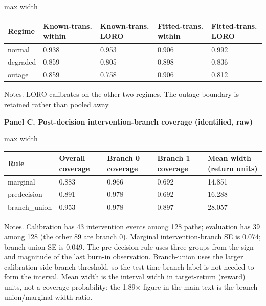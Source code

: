 \begin{table}[!ht]
\begin{adjustbox}{max width=\linewidth}
\begin{tabular}{@{}lllll@{}}
\toprule
Regime & Known-trans. within & Known-trans. LORO & Fitted-trans. within & Fitted-trans. LORO \\
\midrule
normal & 0.938 & 0.953 & 0.906 & 0.992 \\
degraded & 0.859 & 0.805 & 0.898 & 0.836 \\
outage & 0.859 & 0.758 & 0.906 & 0.812 \\
\bottomrule
\end{tabular}
\end{adjustbox}
\vspace{0.5em}
\par\noindent\begin{minipage}{\linewidth}\raggedright{\scriptsize Notes. LORO calibrates on the other two regimes. The outage boundary is retained rather than pooled away.}\end{minipage}\par

\par\textbf{Panel C. Post-decision intervention-branch coverage (identified, raw)}

\begin{adjustbox}{max width=\linewidth}
\begin{tabular}{@{}lllll@{}}
\toprule
Rule & Overall coverage & Branch 0 coverage & Branch 1 coverage & Mean width (return units) \\
\midrule
marginal & 0.883 & 0.966 & 0.692 & 14.851 \\
predecision & 0.891 & 0.978 & 0.692 & 16.288 \\
branch\_union & 0.953 & 0.978 & 0.897 & 28.057 \\
\bottomrule
\end{tabular}
\end{adjustbox}
\vspace{0.5em}
\par\noindent\begin{minipage}{\linewidth}\raggedright{\scriptsize Notes. Calibration has 43 intervention events among 128 paths; evaluation has 39 among 128 (the other 89 are branch 0). Marginal intervention-branch SE is 0.074; branch-union SE is 0.049. The pre-decision rule uses three groups from the sign and magnitude of the last burn-in observation. Branch-union uses the larger calibration-side branch threshold, so the test-time branch label is not needed to form the interval. Mean width is the interval width in target-return (reward) units, not a coverage probability; the 1.89$\times$ figure in the main text is the branch-union/marginal width ratio.}\end{minipage}\par

\end{table}

